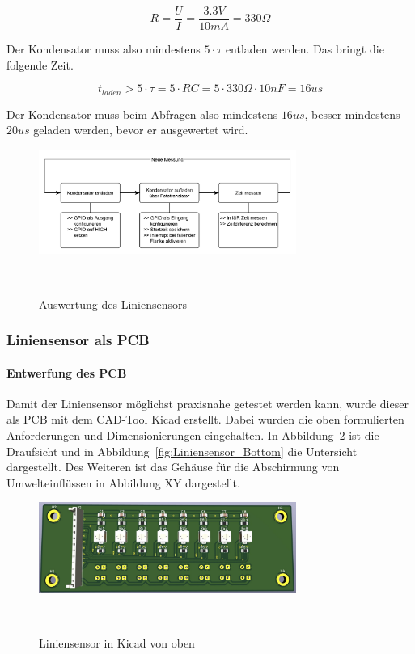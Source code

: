 \documentclass{article}
\begin{document}
\[
    R = \frac{U}{I} = \frac{3.3V}{10mA} = 330 \Omega
\]

Der Kondensator muss also mindestens $5 \cdot \tau$ entladen werden. Das bringt
die folgende Zeit.

\[
    t_{laden} > 5 \cdot \tau = 5 \cdot RC = 5 \cdot 330 \Omega \cdot 10nF = 16us
\]

Der Kondensator muss beim Abfragen also mindestens $16us$, besser mindestens
$20 us$ geladen werden, bevor er ausgewertet wird.

\begin{figure}[H]
    \centering
    \includegraphics[width=0.75\textwidth]{Auswertung.pdf}
    \caption{Auswertung des Liniensensors}~\label{fig:Auswertung_Liniensensor}
\end{figure}


\subsubsection{Liniensensor als PCB}
\paragraph{Entwerfung des PCB}Damit der Liniensensor möglichst praxisnahe getestet 
werden kann, wurde dieser als PCB mit dem CAD-Tool Kicad erstellt. Dabei wurden die 
oben formulierten Anforderungen und Dimensionierungen eingehalten. In Abbildung~\ref{fig:Liniensensor_Top} 
ist die Draufsicht und in Abbildung~\ref{fig:Liniensensor_Bottom} die Untersicht dargestellt. Des Weiteren ist 
das Gehäuse für die Abschirmung von Umwelteinflüssen in Abbildung XY dargestellt.
\begin{figure}[H]
    \centering
    \includegraphics[width=0.75\textwidth]{Liniensensor_Top.pdf}
    \caption{Liniensensor in Kicad von oben}~\label{fig:Liniensensor_Top}
\end{figure}
\end{document}
